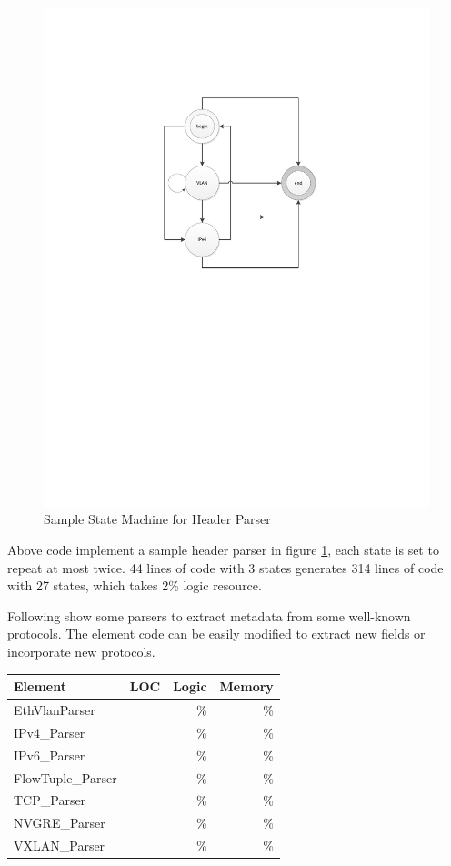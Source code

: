 \begin{figure}[!t]
	\centering
	\includegraphics[width=0.7\columnwidth]{image/StateMachine}
	\vspace{-0.15in}
	\caption{Sample State Machine for Header Parser}
	\vspace{-0.15in}
	\label{clicknp:fig:StateMachine}
\end{figure}

Above code implement a sample header parser in figure \ref{clicknp:fig:StateMachine}, each state is set to repeat at most twice. 44 lines of code with 3 states generates 314 lines of code with 27 states, which takes 2\% logic resource.

Following show some parsers to extract metadata from some well-known protocols. The element code can be easily modified to extract new fields or incorporate new protocols.

\begin{table}[h!]
	\centering
	\label{clicknp:tab:PacketParsers}
	\begin{tabular}{l|r|r|r}
		Element & LOC & Logic & Memory \\
		\hline
		EthVlanParser & & \% & \% \\
		IPv4\_Parser & & \% & \% \\
		IPv6\_Parser & & \% & \% \\
		FlowTuple\_Parser & & \% & \% \\
		TCP\_Parser & & \% & \% \\
		NVGRE\_Parser & & \% & \% \\
		VXLAN\_Parser & & \% & \% \\
	\end{tabular}
\end{table}

